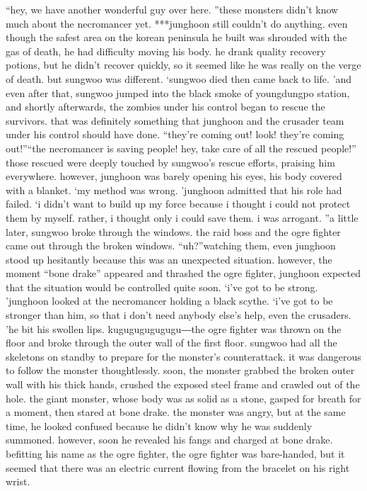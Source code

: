 “hey, we have another wonderful guy over here.
”these monsters didn’t know much about the necromancer yet.
***junghoon still couldn’t do anything.
 even though the safest area on the korean peninsula he built was shrouded with the gas of death, he had difficulty moving his body.
he drank quality recovery potions, but he didn’t recover quickly, so it seemed like he was really on the verge of death.
but sungwoo was different.
‘sungwoo died then came back to life.
’and even after that, sungwoo jumped into the black smoke of youngdungpo station, and shortly afterwards, the zombies under his control began to rescue the survivors.
that was definitely something that junghoon and the crusader team under his control should have done.
“they’re coming out! look! they’re coming out!”“the necromancer is saving people! hey, take care of all the rescued people!”
those rescued were deeply touched by sungwoo’s rescue efforts, praising him everywhere.
however, junghoon was barely opening his eyes, his body covered with a blanket.
‘my method was wrong.
’junghoon admitted that his role had failed.
‘i didn’t want to build up my force because i thought i could not protect them by myself.
 rather, i thought only i could save them.
 i was arrogant.
”a little later, sungwoo broke through the windows.
 the raid boss and the ogre fighter came out through the broken windows.
“uh?”watching them, even junghoon stood up hesitantly because this was an unexpected situation.
however, the moment “bone drake” appeared and thrashed the ogre fighter, junghoon expected that the situation would be controlled quite soon.
‘i’ve got to be strong.
’junghoon looked at the necromancer holding a black scythe.
‘i’ve got to be stronger than him, so that i don’t need anybody else’s help, even the crusaders.
’he bit his swollen lips.
kugugugugugugu―the ogre fighter was thrown on the floor and broke through the outer wall of the first floor.
sungwoo had all the skeletons on standby to prepare for the monster’s counterattack.
it was dangerous to follow the monster thoughtlessly.
soon, the monster grabbed the broken outer wall with his thick hands, crushed the exposed steel frame and crawled out of the hole.
the giant monster, whose body was as solid as a stone, gasped for breath for a moment, then stared at bone drake.
the monster was angry, but at the same time, he looked confused because he didn’t know why he was suddenly summoned.
however, soon he revealed his fangs and charged at bone drake.
befitting his name as the ogre fighter, the ogre fighter was bare-handed, but it seemed that there was an electric current flowing from the bracelet on his right wrist.

